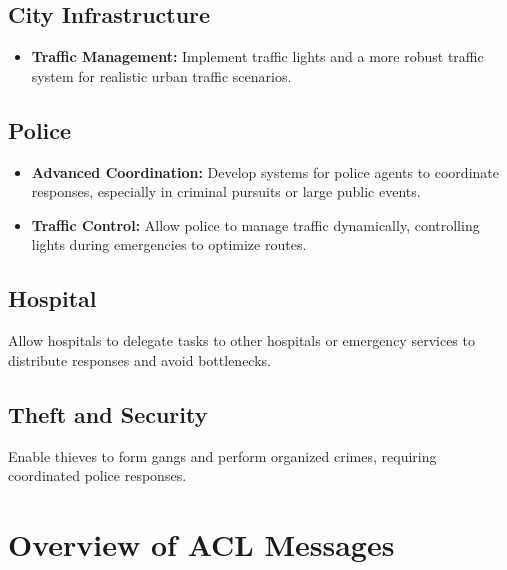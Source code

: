 \documentclass[conference]{IEEEtran}
\begin{document}
  \subsection{City Infrastructure}
  \begin{itemize}
  \item \textbf{Traffic Management:} Implement traffic lights and a more robust traffic system for realistic urban traffic scenarios.
  \end{itemize}
  
  \subsection{Police}
  \begin{itemize}
  \item \textbf{Advanced Coordination:} Develop systems for police agents to coordinate responses, especially in criminal pursuits or large public events.
  \item \textbf{Traffic Control:} Allow police to manage traffic dynamically, controlling lights during emergencies to optimize routes.
  \end{itemize}
  
  \subsection{Hospital}
Allow hospitals to delegate tasks to other hospitals or emergency services to distribute responses and avoid bottlenecks.

  \subsection{Theft and Security}
  Enable thieves to form gangs and perform organized crimes, requiring coordinated police responses.


\section{Overview of ACL Messages}
\end{document}
